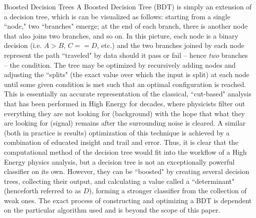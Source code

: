 \begin{section}{Boosted Decision Trees}
A Boosted Decision Tree (BDT) is simply an extension of a decision tree, which is can be visualized as follows: starting from a single ``node," two ``branches" emerge; at the end of each branch, there is another node that also joins two branches, and so on. In this picture, each node is a binary decision (i.e. $A > B$, $C == D$, etc.) and the two branches joined by each node represent the path ``traveled" by data should it pass or fail -- hence \textit{two} branches -- the condition. The tree may be optimized by recursively adding nodes and adjusting the ``splits" (the exact value over which the input is split) at each node until some given condition is met such that an optimal configuration is reached. This is essentially an accurate representation of the classical, ``cut-based" analysis that has been performed in High Energy for decades, where physicists filter out everything they are not looking for (background) with the hope that what they are looking for (signal) remains after the surrounding noise is cleared. A similar (both in practice is results) optimization of this technique is achieved by a combination of educated insight and trail and error. Thus, it is clear that the computational method of the decision tree would fit into the workflow of a High Energy physics analysis, but a decision tree is not an exceptionally powerful classifier on its own. However, they can be ``boosted" by creating several decision trees, collecting their output, and calculating a value called a ``determinant" (henceforth referred to as $D$), forming a stronger classifier from the collection of weak ones. The exact process of constructing and optimizing a BDT is dependent on the particular algorithm used and is beyond the scope of this paper.
\end{section}